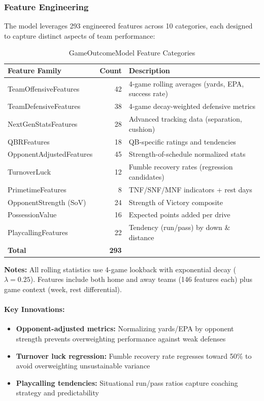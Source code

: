 \subsubsection{Feature Engineering}
\label{subsec:game-outcome-features}

The model leverages 293 engineered features across 10 categories, each designed to capture distinct aspects of team performance:

\begin{table}[htbp]
\centering
\caption{GameOutcomeModel Feature Categories}
\label{tab:game-outcome-features}
\small
\begin{tabular}{@{}lrl@{}}
\toprule
\textbf{Feature Family} & \textbf{Count} & \textbf{Description} \\
\midrule
TeamOffensiveFeatures & 42 & 4-game rolling averages (yards, EPA, success rate) \\
TeamDefensiveFeatures & 38 & 4-game decay-weighted defensive metrics \\
NextGenStatsFeatures & 28 & Advanced tracking data (separation, cushion) \\
QBRFeatures & 18 & QB-specific ratings and tendencies \\
OpponentAdjustedFeatures & 45 & Strength-of-schedule normalized stats \\
TurnoverLuck & 12 & Fumble recovery rates (regression candidates) \\
PrimetimeFeatures & 8 & TNF/SNF/MNF indicators + rest days \\
OpponentStrength (SoV) & 24 & Strength of Victory composite \\
PossessionValue & 16 & Expected points added per drive \\
PlaycallingFeatures & 22 & Tendency (run/pass) by down \& distance \\
\midrule
\textbf{Total} & \textbf{293} & \\
\bottomrule
\end{tabular}
\begin{tablenotes}
\item \textbf{Notes:} All rolling statistics use 4-game lookback with exponential decay ($\lambda = 0.25$). Features include both home and away teams (146 features each) plus game context (week, rest differential).
\end{tablenotes}
\end{table}

\paragraph{Key Innovations:}
\begin{itemize}[itemsep=2pt,parsep=0pt]
    \item \textbf{Opponent-adjusted metrics:} Normalizing yards/EPA by opponent strength prevents overweighting performance against weak defenses
    \item \textbf{Turnover luck regression:} Fumble recovery rate regresses toward 50\% to avoid overweighting unsustainable variance
    \item \textbf{Playcalling tendencies:} Situational run/pass ratios capture coaching strategy and predictability
\end{itemize}

